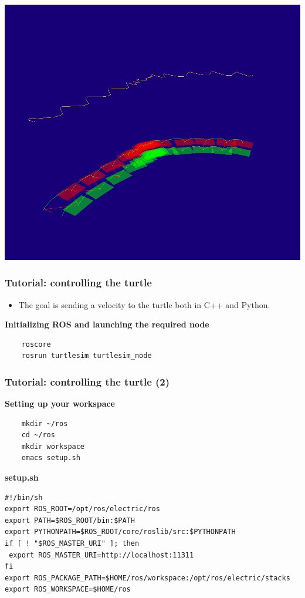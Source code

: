 \documentclass[hyperref={pdfpagelabels=false}]{beamer}
\begin{document}
\begin{frame}[fragile]
  \begin{center}
    \includegraphics[width=.8\linewidth]{walk_and_drop.png}
  \end{center}
\end{frame}


\begin{frame}[fragile]
  \frametitle{Tutorial: controlling the turtle}

  \begin{itemize}
  \item The goal is sending a velocity to the turtle both in C++ and
    Python.
  \end{itemize}

  \textbf{Initializing ROS and launching the required node}
  \begin{verbatim}
    roscore
    rosrun turtlesim turtlesim_node
  \end{verbatim}
\end{frame}

\begin{frame}[fragile]
  \frametitle{Tutorial: controlling the turtle (2)}

  \textbf{Setting up your workspace}
  \begin{verbatim}
    mkdir ~/ros
    cd ~/ros
    mkdir workspace
    emacs setup.sh
  \end{verbatim}

  \textbf{setup.sh}
  \footnotesize
  \begin{verbatim}
#!/bin/sh
export ROS_ROOT=/opt/ros/electric/ros
export PATH=$ROS_ROOT/bin:$PATH
export PYTHONPATH=$ROS_ROOT/core/roslib/src:$PYTHONPATH
if [ ! "$ROS_MASTER_URI" ]; then
 export ROS_MASTER_URI=http://localhost:11311
fi
export ROS_PACKAGE_PATH=$HOME/ros/workspace:/opt/ros/electric/stacks
export ROS_WORKSPACE=$HOME/ros
  \end{verbatim}
\end{frame}
\end{document}
